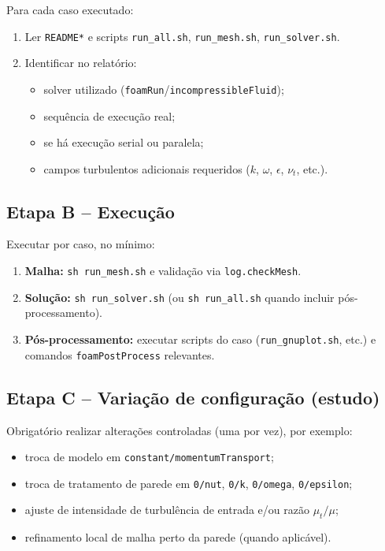 \documentclass[12pt,a4paper]{article}
\begin{document}
Para cada caso executado:

\begin{enumerate}[label=\alph*)]
  \item Ler \texttt{README*} e scripts \texttt{run\_all.sh}, \texttt{run\_mesh.sh}, \texttt{run\_solver.sh}.
  \item Identificar no relatório:
  \begin{itemize}
    \item solver utilizado (\texttt{foamRun}/\texttt{incompressibleFluid});
    \item sequência de execução real;
    \item se há execução serial ou paralela;
    \item campos turbulentos adicionais requeridos ($k$, $\omega$, $\epsilon$, $\nu_t$, etc.).
  \end{itemize}
\end{enumerate}

\subsection{Etapa B -- Execução}

Executar por caso, no mínimo:

\begin{enumerate}[label=\alph*)]
  \item \textbf{Malha:} \texttt{sh run\_mesh.sh} e validação via \texttt{log.checkMesh}.
  \item \textbf{Solução:} \texttt{sh run\_solver.sh} (ou \texttt{sh run\_all.sh} quando incluir pós-processamento).
  \item \textbf{Pós-processamento:} executar scripts do caso (\texttt{run\_gnuplot.sh}, etc.) e comandos \texttt{foamPostProcess} relevantes.
\end{enumerate}

\subsection{Etapa C -- Variação de configuração (estudo)}

Obrigatório realizar alterações controladas (uma por vez), por exemplo:
\begin{itemize}
  \item troca de modelo em \texttt{constant/momentumTransport};
  \item troca de tratamento de parede em \texttt{0/nut}, \texttt{0/k}, \texttt{0/omega}, \texttt{0/epsilon};
  \item ajuste de intensidade de turbulência de entrada e/ou razão $\mu_t/\mu$;
  \item refinamento local de malha perto da parede (quando aplicável).
\end{itemize}
\end{document}
